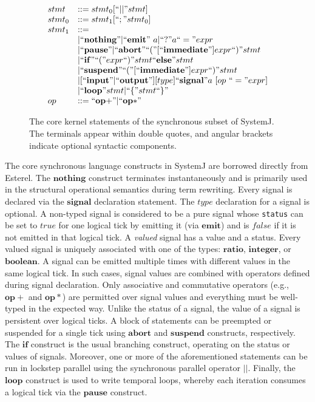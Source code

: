 \documentclass[10pt,journal,cspaper,compsoc]{IEEEtran}
\begin{document}
\begin{figure}[t!]
  \centering
   \[
   \begin{array}{ll}
     stmt & ::=  stmt_0 [\mathrm{``||"} stmt] \\
     stmt_0 & ::= stmt_1 [``;" stmt_0] \\
     stmt_1 & ::= \\
     & | ``\mathbf{nothing}" | ``\mathbf{emit}"\ a | ``?"a ``=" expr \\
     & | ``\mathbf{pause}" | ``\mathbf{abort}" ``("
     [``\mathbf{immediate}"] expr ``)" stmt \\
     & | ``\mathbf{if}" ``(" expr ``)" stmt ``\mathbf{else}"
     stmt \\
     & | ``\mathbf{suspend}" ``("
     [``\mathbf{immediate}"] expr ``)" stmt \\
     & | [``\mathbf{input}" | ``\mathbf{output}" ] [type] ``\mathbf{signal}" a\ [op\ ``="
     expr] \\
     & | ``\mathbf{loop}" stmt
     | ``\{" stmt ``\}" \\
     op & ::= ``\mathbf{op+}" | ``\mathbf{op*}"
   \end{array}
   \]
   \caption{The core kernel statements of the synchronous subset of
     SystemJ. The terminals appear within double quotes, and angular
     brackets indicate optional syntactic components.}
  \label{fig:5}
\end{figure}

The core synchronous language constructs in SystemJ are borrowed
directly from Esterel. The $\mathbf{nothing}$ construct terminates
instantaneously and is primarily used in the structural operational
semantics during term rewriting. Every signal is declared via the
$\mathbf{signal}$ declaration statement. The $type$ declaration for a
signal is optional. A non-typed signal is considered to be a pure signal
whose \texttt{status} can be set to $true$ for one logical tick by
emitting it (via $\mathbf{emit}$) and is $false$ if it is not emitted in
that logical tick. A \textit{valued} signal has a value and a
status. Every valued signal is uniquely associated with one of the
types: $\mathbf{ratio}$, $\mathbf{integer}$, or $\mathbf{boolean}$. A
signal can be emitted multiple times with different values in the same
logical tick. In such cases, signal values are combined with operators
defined during signal declaration. Only associative and commutative
operators (e.g., $\mathbf{op+}$ and $\mathbf{op*}$) are permitted over
signal values and everything must be well-typed in the expected
way. Unlike the status of a signal, the value of a signal is persistent
over logical ticks. A block of statements can be preempted or suspended
for a single tick using $\mathbf{abort}$ and $\mathbf{suspend}$
constructs, respectively. The $\mathbf{if}$ construct is the usual
branching construct, operating on the status or values of
signals. Moreover, one or more of the aforementioned statements can be
run in lockstep parallel using the synchronous parallel operator $||$.
Finally, the $\mathbf{loop}$ construct is used to write temporal loops,
whereby each iteration consumes a logical tick via the $\mathbf{pause}$
construct.
\end{document}
